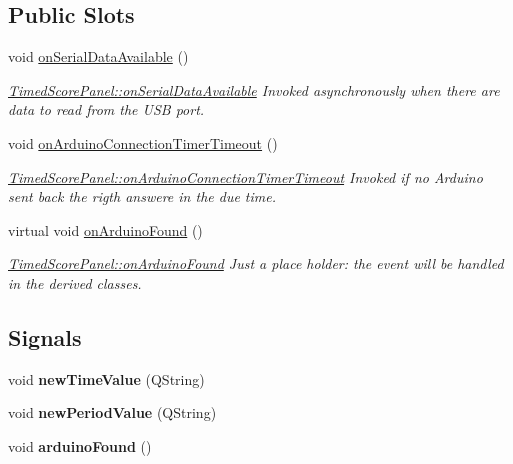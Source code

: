 \subsection*{Public Slots}
\begin{DoxyCompactItemize}
\item 
\mbox{\label{classTimedScorePanel_a1962b09445875f5d4766b03616a17b90}} 
void \mbox{\hyperlink{classTimedScorePanel_a1962b09445875f5d4766b03616a17b90}{on\+Serial\+Data\+Available}} ()
\begin{DoxyCompactList}\small\item\em \mbox{\hyperlink{classTimedScorePanel_a1962b09445875f5d4766b03616a17b90}{Timed\+Score\+Panel\+::on\+Serial\+Data\+Available}} Invoked asynchronously when there are data to read from the U\+SB port. \end{DoxyCompactList}\item 
\mbox{\label{classTimedScorePanel_afbf7c67ae85927b3a81ead856373dba8}} 
void \mbox{\hyperlink{classTimedScorePanel_afbf7c67ae85927b3a81ead856373dba8}{on\+Arduino\+Connection\+Timer\+Timeout}} ()
\begin{DoxyCompactList}\small\item\em \mbox{\hyperlink{classTimedScorePanel_afbf7c67ae85927b3a81ead856373dba8}{Timed\+Score\+Panel\+::on\+Arduino\+Connection\+Timer\+Timeout}} Invoked if no Arduino sent back the rigth answere in the due time. \end{DoxyCompactList}\item 
\mbox{\label{classTimedScorePanel_ad7ab6b2d7de191d2d2bea1f32a34fce1}} 
virtual void \mbox{\hyperlink{classTimedScorePanel_ad7ab6b2d7de191d2d2bea1f32a34fce1}{on\+Arduino\+Found}} ()
\begin{DoxyCompactList}\small\item\em \mbox{\hyperlink{classTimedScorePanel_ad7ab6b2d7de191d2d2bea1f32a34fce1}{Timed\+Score\+Panel\+::on\+Arduino\+Found}} Just a place holder\+: the event will be handled in the derived classes. \end{DoxyCompactList}\end{DoxyCompactItemize}
\subsection*{Signals}
\begin{DoxyCompactItemize}
\item 
\mbox{\label{classTimedScorePanel_a46c1848c7cdcff881036d476a78da36f}} 
void {\bfseries new\+Time\+Value} (Q\+String)
\item 
\mbox{\label{classTimedScorePanel_a5163ae8035d27567c04f6e54caa3366f}} 
void {\bfseries new\+Period\+Value} (Q\+String)
\item 
\mbox{\label{classTimedScorePanel_aed0b9cf91221704fec13d1bf1d5e9f9e}} 
void {\bfseries arduino\+Found} ()
\end{DoxyCompactItemize}
